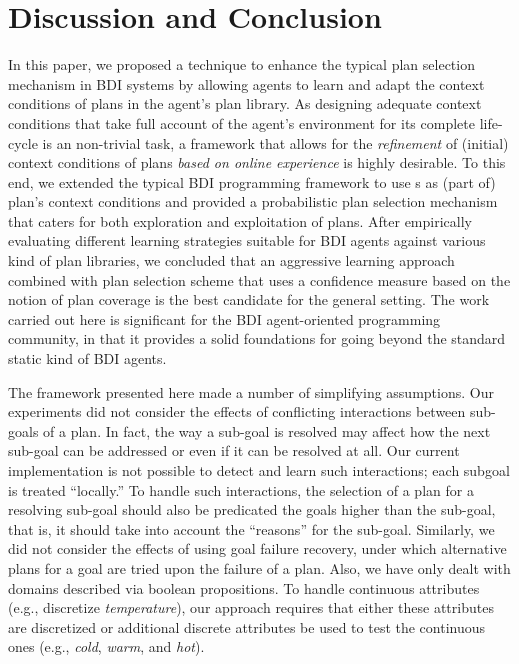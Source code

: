 \section{Discussion and Conclusion}\label{sec:discussion}

In this paper, we proposed a technique to enhance the typical plan selection
mechanism in BDI systems by allowing agents to learn and adapt the context
conditions of plans in the agent's plan library.
As designing adequate context conditions that take full account of the agent's
environment for its complete life-cycle is an non-trivial task, a framework that
allows for the \emph{refinement} of (initial) context conditions of plans
\textit{based on online experience} is highly desirable.
To this end, we extended the typical BDI programming framework to use \dt{}s as
(part of) plan's context conditions and provided a probabilistic plan selection
mechanism that caters for both exploration and exploitation of plans.
After empirically evaluating different learning strategies suitable for BDI
agents against various kind of plan libraries, we concluded that an aggressive
learning approach combined with plan selection scheme that uses a confidence
measure based on the notion of plan coverage is the best candidate for the
general setting.
The work carried out here is significant for the BDI agent-oriented programming
community, in that it provides a solid foundations for going beyond the standard
static kind of BDI agents.


The framework presented here made a number of simplifying assumptions.
Our experiments did not consider the effects of conflicting interactions between
sub-goals of a plan. In fact, the way a sub-goal is resolved may affect how the
next sub-goal can be addressed or even if it can be resolved at all.
Our current implementation is not possible to detect and learn such interactions;
each subgoal is treated ``locally.'' To handle such interactions, the selection
of a plan for a resolving sub-goal should also be predicated the goals higher
than the sub-goal, that is, it should take into account the ``reasons'' for the
sub-goal.
Similarly, we did not consider the effects of using goal failure recovery, under
which alternative plans for a goal are tried upon the failure of a plan.
Also, we have only dealt with domains described via boolean propositions. To
handle continuous attributes (e.g., discretize \emph{temperature}), our approach
requires that either these attributes are discretized or additional discrete
attributes be used to test the continuous ones (e.g., \emph{cold}, \emph{warm},
and \emph{hot}).


